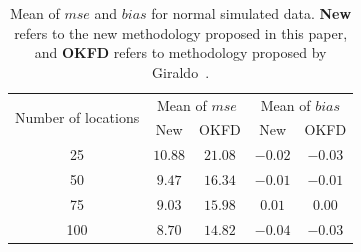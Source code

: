 \documentclass[12pt]{interact}
\theoremstyle{plain}%
\theoremstyle{definition}
\theoremstyle{remark}
\begin{document}
\begin{table}[p]
	\centering
	\caption{Mean of $mse$ and $bias$ for normal simulated data. \textbf{New} refers to the new methodology proposed in this paper, and \textbf{OKFD} refers to methodology proposed by Giraldo~\cite{giraldo2011ordinary}.}
	\label{tab:summary-normal}
	\begin{tabular}{ccc|cc}
		\toprule
		\multirow{2}{*}{Number of locations}& \multicolumn{2}{c|}{Mean of $mse$} & \multicolumn{2}{|c}{Mean of $bias$}\\ \cmidrule{2-5}
		& New & OKFD & New & OKFD \\ \midrule
		25 & $10.88$ & $21.08$ & $-0.02$ & $-0.03$\\
		50 & $9.47$ & $16.34$ & $-0.01$ & $-0.01$\\
		75 & $9.03$ & $15.98$ & $0.01$ & $0.00$\\
		100 & $8.70$ & $14.82$ & $-0.04$ & $-0.03$\\ \bottomrule
	\end{tabular}
\end{table}
\end{document}
